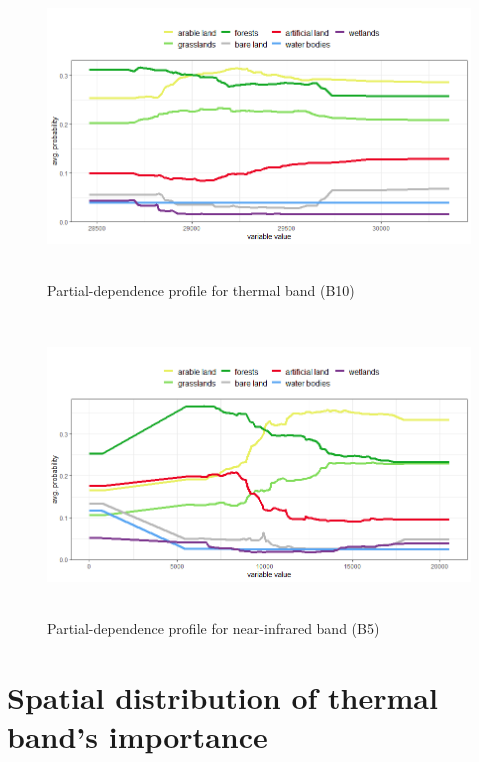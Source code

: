 \documentclass{amuthesis}
\begin{document}
\begin{figure}[H]

{\centering \includegraphics[width=5.90625in,height=3.125in]{./figures/profB10.png}

}

\caption{\label{fig-rycina15}Partial-dependence profile for thermal band
(B10)}

\end{figure}

\begin{figure}[H]

{\centering \includegraphics[width=5.90625in,height=3.125in]{./figures/profB5.png}

}

\caption{\label{fig-rycina16}Partial-dependence profile for
near-infrared band (B5)}

\end{figure}

\hypertarget{sec-imp-spat}{%
\section{Spatial distribution of thermal band's
importance}\label{sec-imp-spat}}
\end{document}

